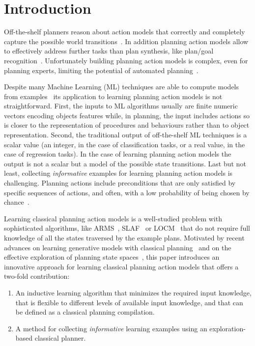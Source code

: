 \documentclass[letterpaper]{article} %
\begin{document}
\section{Introduction}
Off-the-shelf planners reason about action models that correctly and completely capture the possible world transitions~\cite{geffner:book:2013}. In addition planning action models allow to effectively address further tasks than plan synthesis, like plan/goal recognition~\cite{ramirez2010probabilistic}. Unfortunately building planning action models is complex, even for planning experts, limiting the potential of automated planning~\cite{kambhampati:modellite:AAAI2007}. 

Despite many Machine Learning (ML) techniques are able to compute models from examples~\cite{michalski2013machine} its application to learning planning action models is not straightforward. First, the inputs to ML algorithms usually are finite numeric vectors encoding objects features while, in planning, the input includes actions so is closer to the representation of procedures and behaviours rather than to object representation. Second, the traditional output of off-the-shelf ML techniques is a scalar value (an integer, in the case of classification tasks, or a real value, in the case of regression tasks). In the case of learning planning action models the output is not a scalar but a model of the possible state transitions. Last but not least, collecting {\em informative} examples for learning planning action models is challenging. Planning actions include preconditions that are only satisfied by specific sequences of actions, and often, with a low probability of being chosen by chance~\cite{fern2004learning}.

Learning classical planning action models is a well-studied problem with sophisticated algorithms, like ARMS~\cite{yang2007learning}, SLAF~\cite{amir:alearning:JAIR08} or LOCM~\cite{cresswell2013acquiring} that do not require full knowledge of all the states traversed by the example plans. Motivated by recent advances on learning generative models with classical planning~\cite{segovia2017generating} and on the effective exploration of planning state spaces~\cite{geffner:novelty:IJCAI17}, this paper introduces an innovative approach for learning classical planning action models that offers a two-fold contribution:
\begin{enumerate}
\item An inductive learning algorithm that minimizes the required input knowledge, that is flexible to different levels of available input knowledge, and that can be defined as a classical planning compilation. 
\item A method for collecting {\em informative} learning examples using an exploration-based classical planner.
\end{enumerate}
\end{document}
